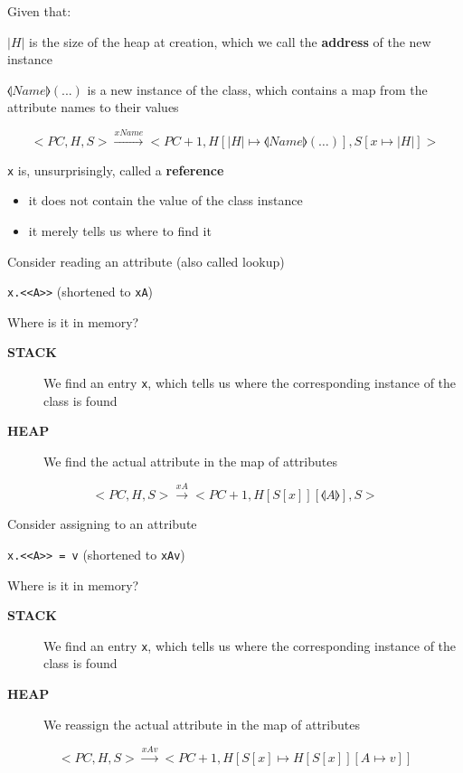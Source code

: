 \documentclass{beamer}
\begin{document}
\begin{slide}{
\item Given that:
\item $|H|$ is the size of the heap at creation, which we call the \textbf{address} of the new instance
\item $\llangle Name \rrangle(...)$ is a new instance of the class, which contains a map from the attribute names to their values

\fontsize{8pt}{7.2}\selectfont
$$<PC,H,S> \overset{xName}{\rightarrow} <PC+1,H[|H| \mapsto \llangle Name \rrangle(\dots)],S[x \mapsto |H|]>$$

\item \texttt{x} is, unsurprisingly, called a \textbf{reference}
\begin{itemize}
\item it does not contain the value of the class instance
\item it merely tells us where to find it
\end{itemize}
}\end{slide}

\begin{slide}{
\item Consider reading an attribute (also called lookup)
\item \texttt{x.<<A>>} (shortened to \texttt{xA})
\item Where is it in memory?
\begin{description}
\item[\textbf{STACK}] We find an entry \texttt{x}, which tells us where the corresponding instance of the class is found
\item[\textbf{HEAP}] We find the actual attribute in the map of attributes
\end{description}

$$<PC,H,S> \overset{xA}{\rightarrow} <PC+1,H[S[x]][\llangle A \rrangle],S>$$
}\end{slide}



\begin{slide}{
\item Consider assigning to an attribute
\item \texttt{x.<<A>> = v} (shortened to \texttt{xAv})
\item Where is it in memory?
\begin{description}
\item[\textbf{STACK}] We find an entry \texttt{x}, which tells us where the corresponding instance of the class is found
\item[\textbf{HEAP}] We reassign the actual attribute in the map of attributes
\end{description}

$$<PC,H,S> \overset{xAv}{\rightarrow} <PC+1,H[S[x] \mapsto H[S[x]][A \mapsto v]]$$
}\end{slide}
\end{document}
